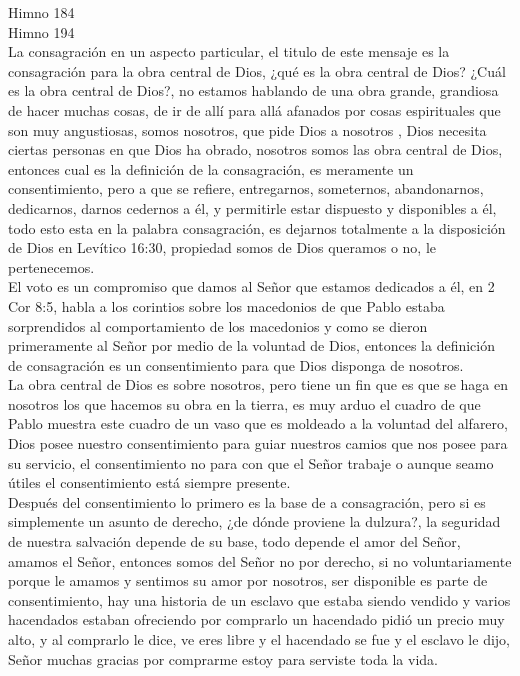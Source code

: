 \documentclass[12pt]{article}
\begin{document}
Himno 184\\

Himno 194\\

La consagración en un aspecto particular, el titulo de este mensaje es la consagración para la obra central de Dios, ¿qué es la obra central de Dios? ¿Cuál es la obra central de Dios?, no estamos hablando de una obra grande, grandiosa de hacer muchas cosas, de ir de allí para allá afanados por cosas espirituales que son muy angustiosas, somos nosotros, que pide Dios a nosotros , Dios necesita ciertas personas en que Dios ha obrado, nosotros somos las obra central de Dios, entonces cual es la definición de la consagración, es meramente un consentimiento, pero a que se refiere, entregarnos, someternos, abandonarnos, dedicarnos, darnos cedernos a él, y permitirle estar dispuesto y disponibles a él, todo esto esta en la palabra consagración, es dejarnos totalmente a la disposición de Dios en Levítico 16:30, propiedad somos de Dios queramos o no, le pertenecemos.\\

El voto es un compromiso que damos al Señor que estamos dedicados a él, en 2 Cor 8:5, habla a los corintios sobre los macedonios de que Pablo estaba sorprendidos al comportamiento de los macedonios y como se dieron primeramente al Señor por medio de la voluntad de Dios, entonces la definición de consagración es un consentimiento para que Dios disponga de nosotros.\\

La obra central de Dios es sobre nosotros, pero tiene un fin que es que se haga en nosotros los que hacemos su obra en la tierra, es muy arduo el cuadro de que Pablo muestra este cuadro de un vaso que es moldeado a la voluntad del alfarero, Dios posee nuestro consentimiento para guiar nuestros camios que nos posee para su servicio, el consentimiento no para con que el Señor trabaje o aunque seamo útiles el consentimiento está siempre presente.\\

Después del consentimiento lo primero es la base de a consagración, pero si es simplemente un asunto de derecho, ¿de dónde proviene la dulzura?, la seguridad de nuestra salvación depende de su base, todo depende el amor del Señor, amamos el Señor, entonces somos del Señor no por derecho, si no voluntariamente porque le amamos y sentimos su amor por nosotros, ser disponible es parte de consentimiento, hay una historia  de un esclavo que estaba siendo vendido y varios hacendados estaban ofreciendo por comprarlo un hacendado pidió un precio muy alto, y al comprarlo le dice, ve eres libre y el hacendado se fue y el esclavo le dijo, Señor muchas gracias por comprarme estoy para serviste toda la vida.\\
\end{document}
